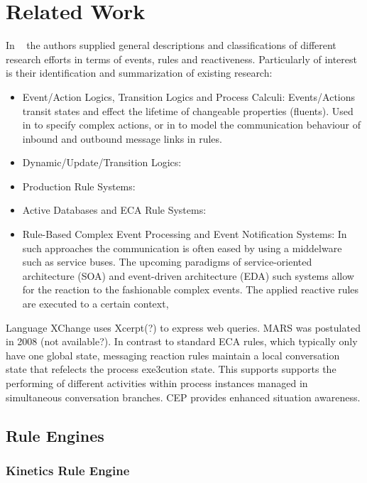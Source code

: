 \documentclass[11pt,twocolumn]{article}
\begin{document}
\section{Related Work}
In ~\cite{2009-Paschke_Boley-RCER.pdf} the authors supplied general descriptions and classifications of different research efforts in terms of events, rules and reactiveness. Particularly of interest is their identification and summarization of existing research:
 \begin{itemize}
  \item Event/Action Logics, Transition Logics and Process Calculi: Events/Actions transit states and effect the lifetime of changeable properties (fluents). Used in \cite{Behrends:2008:EEA:1377798.1377801} to specify complex actions, or in to model the communication behaviour of inbound and outbound message links in rules.
  \item Dynamic/Update/Transition Logics: 
  \item Production Rule Systems:
  \item Active Databases and ECA Rule Systems:
  \item Rule-Based Complex Event Processing and Event Notification Systems: In such approaches the communication is often eased by using a middelware such as service buses. The upcoming paradigms of service-oriented architecture (SOA) and event-driven architecture (EDA) such systems allow for the reaction to the fashionable complex events. The applied reactive rules are executed to a certain context,

\end{itemize}
Language XChange uses Xcerpt(?) to express web queries. MARS was postulated in 2008 (not available?).
In contrast to standard ECA rules, which typically only have one global state, messaging reaction rules maintain a local conversation state that refelects the process exe3cution state. This supports supports the performing of different activities within process instances managed in simultaneous conversation branches.
CEP  provides enhanced situation awareness.


\subsection{Rule Engines}

\subsubsection{Kinetics Rule Engine}
\end{document}
